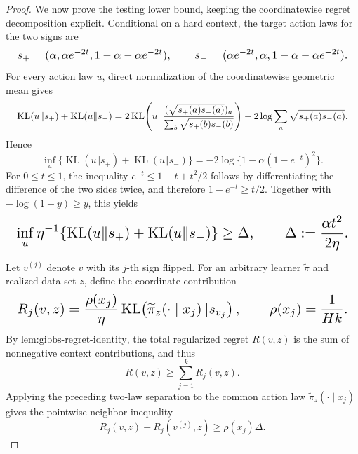 \documentclass{article}
\begin{document}
\begin{proof}
We now prove the testing lower bound, keeping the coordinatewise regret decomposition explicit. Conditional on a hard context, the target action laws for the two signs are
\[
\makebox[\linewidth][c]{\resizebox{0.98\linewidth}{!}{\(\displaystyle s_+=(\alpha,\alpha e^{-2t},1-\alpha-\alpha e^{-2t}),\qquad
s_-=(\alpha e^{-2t},\alpha,1-\alpha-\alpha e^{-2t}).\)}}
\]
For every action law \(u\), direct normalization of the coordinatewise geometric mean gives
\[
\makebox[\linewidth][c]{\resizebox{0.98\linewidth}{!}{\(\displaystyle \operatorname{KL}(u\Vert s_+)+\operatorname{KL}(u\Vert s_-)
=2\operatorname{KL}\!\left(u\middle\Vert
\frac{(\sqrt{s_+(a)s_-(a)})_a}{\sum_b\sqrt{s_+(b)s_-(b)}}\right)
-2\log\sum_a\sqrt{s_+(a)s_-(a)}.\)}}
\]
Hence
\[
\inf_u\{\operatorname{KL}(u\Vert s_+)+\operatorname{KL}(u\Vert s_-)\}
=-2\log\{1-\alpha(1-e^{-t})^2\}.
\]
For \(0\le t\le1\), the inequality \(e^{-t}\le1-t+t^2/2\) follows by differentiating the difference of the two sides twice, and therefore \(1-e^{-t}\ge t/2\). Together with \(-\log(1-y)\ge y\), this yields
\[
\makebox[\linewidth][c]{\resizebox{0.98\linewidth}{!}{\(\displaystyle \inf_u\eta^{-1}\{\operatorname{KL}(u\Vert s_+)+\operatorname{KL}(u\Vert s_-)\}
\ge \Delta,
\qquad
\Delta:=\frac{\alpha t^2}{2\eta}.\)}}
\]

Let \(v^{(j)}\) denote \(v\) with its \(j\)-th sign flipped. For an arbitrary learner \(\widetilde\pi\) and realized data set \(z\), define the coordinate contribution
\[
\makebox[\linewidth][c]{\resizebox{0.98\linewidth}{!}{\(\displaystyle R_j(v,z)=\frac{\rho(x_j)}{\eta}
\operatorname{KL}\!\left(\widetilde\pi_z(\cdot\mid x_j)\Vert s_{v_j}\right),
\qquad \rho(x_j)=\frac1{Hk}.\)}}
\]
By \(\text{lem:gibbs-regret-identity}\), the total regularized regret \(R(v,z)\) is the sum of nonnegative context contributions, and thus
\[
R(v,z)\ge\sum_{j=1}^kR_j(v,z).
\]
Applying the preceding two-law separation to the common action law \(\widetilde\pi_z(\cdot\mid x_j)\) gives the pointwise neighbor inequality
\[
R_j(v,z)+R_j(v^{(j)},z)\ge\rho(x_j)\Delta.
\]


\end{proof}
\end{document}
